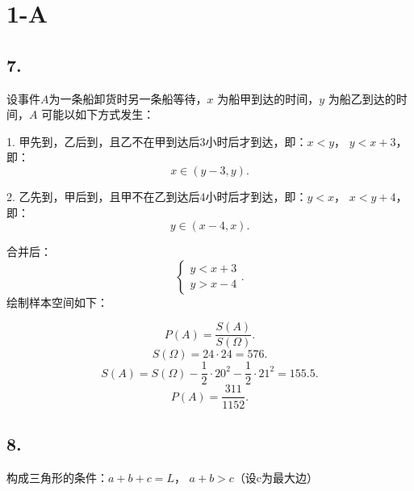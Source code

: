 \def\lecturer{李漫漫}
\def\noter{THF}
\def\className{className}
\def\term{term}



\maketitle
\tableofcontents
\section{1-A}%
\label{sec:1-A}
\subsection{7.}%
\label{sub:7.}
设事件$A$为一条船卸货时另一条船等待，$x$ 为船甲到达的时间，$y$ 为船乙到达的时间，$A$ 可能以如下方式发生：

1. 甲先到，乙后到，且乙不在甲到达后3小时后才到达，即：$x<y$， $y<x+3$，即：\[
    x\in \left( y-3,y \right) 
.\] 

2. 乙先到，甲后到，且甲不在乙到达后4小时后才到达，即：$y<x$， $x<y+4$，即：\[
    y\in \left( x-4,x \right) 
.\] 

合并后：\[
    \begin{cases}
        y<x+3\\
        y>x-4
    \end{cases}
.\] 
绘制样本空间如下：
\begin{center}
\end{center}
\[
    P\left( A \right) =\frac{S\left( A \right) }{S\left( \Omega \right) }
.\] 
\[
    S\left( \Omega \right) =24\cdot 24=576
.\] 
\[
    S\left( A \right) =S\left( \Omega \right) -\frac{1}{2}\cdot 20^2-\frac{1}{2}\cdot 21^2=155.5
.\] 
\[
    P\left( A \right) =\frac{311}{1152}
.\] 

\subsection{8.}%
\label{sub:8.}
构成三角形的条件：$a+b+c=L$， $a+b>c$（设c为最大边）
 
